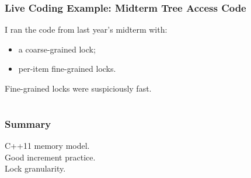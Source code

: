 \documentclass[aspectratio=43]{beamer}
\newenvironment{changemargin}[1]{%
  \begin{list}{}{%
    \setlength{\topsep}{0pt}%
    \setlength{\leftmargin}{#1}%
    \setlength{\rightmargin}{1em}
    \setlength{\listparindent}{\parindent}%
    \setlength{\itemindent}{\parindent}%
    \setlength{\parsep}{\parskip}%
  }%
  \item[]}{\end{list}}
\begin{document}
\begin{frame}
  \frametitle{Live Coding Example: Midterm Tree Access Code}

  \begin{changemargin}{1cm}
    I ran the code from last year's midterm with:
    \begin{itemize}
    \item a coarse-grained lock;
    \item per-item fine-grained locks.
    \end{itemize}
    Fine-grained locks were suspiciously fast.
    
  \end{changemargin}

\end{frame}

\section{}
\begin{frame}
  \frametitle{Summary}

  \begin{changemargin}{1.5cm}
 C++11 memory model.\\
 
 Good increment practice. \\

 Lock granularity.

  \end{changemargin}
\end{frame}
\end{document}
